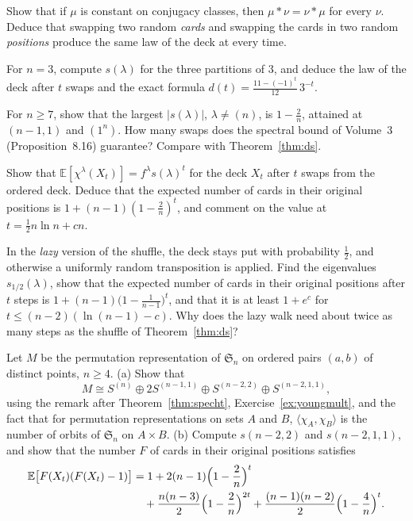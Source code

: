 \begin{exercise}[$\star$]\label{ex:leftright}
Show that if $\mu$ is constant on conjugacy classes, then $\mu*\nu=\nu*\mu$ for every $\nu$. Deduce that swapping two random \emph{cards} and swapping the cards in two random \emph{positions} produce the same law of the deck at every time.
\end{exercise}

\begin{exercise}[$\star$]\label{ex:threecards}
For $n=3$, compute $s(\lambda)$ for the three partitions of $3$, and deduce the law of the deck after $t$ swaps and the exact formula $d(t)=\frac{11-(-1)^t}{12}\,3^{-t}$.
\end{exercise}

\begin{exercise}[$\star$]\label{ex:spectralonly}
For $n\ge7$, show that the largest $|s(\lambda)|$, $\lambda\ne(n)$, is $1-\frac2n$, attained at $(n-1,1)$ and $(1^n)$. How many swaps does the spectral bound of Volume~3 (Proposition~8.16) guarantee? Compare with Theorem~\ref{thm:ds}.
\end{exercise}

\begin{exercise}[$\star\star$]\label{ex:fixedpoints}
Show that $\mathbb E[\chi^\lambda(X_t)]=f^\lambda s(\lambda)^t$ for the deck $X_t$ after $t$ swaps from the ordered deck. Deduce that the expected number of cards in their original positions is $1+(n-1)(1-\frac2n)^t$, and comment on the value at $t=\frac12n\ln n+cn$.
\end{exercise}

\begin{exercise}[$\star\star$]\label{ex:lazyhalf}
In the \emph{lazy} version of the shuffle, the deck stays put with probability $\frac12$, and otherwise a uniformly random transposition is applied. Find the eigenvalues $s_{1/2}(\lambda)$, show that the expected number of cards in their original positions after $t$ steps is
$1+(n-1)\bigl(1-\frac1{n-1}\bigr)^t$, and that it is at least $1+e^c$ for $t\le(n-2)(\ln(n-1)-c)$. Why does the lazy walk need about twice as many steps as the shuffle of Theorem~\ref{thm:ds}?
\end{exercise}

\begin{exercise}[$\star\star\star$]\label{ex:orderedpairs}
Let $M$ be the permutation representation of $\mathfrak S_n$ on ordered pairs $(a,b)$ of distinct points, $n\ge4$. (a) Show that
\[
M\cong S^{(n)}\oplus2S^{(n-1,1)}\oplus S^{(n-2,2)}\oplus S^{(n-2,1,1)},
\]
using the remark after Theorem~\ref{thm:specht}, Exercise~\ref{ex:youngmult}, and the fact that for permutation representations on sets $A$ and $B$, $\langle\chi_A,\chi_B\rangle$ is the number of orbits of $\mathfrak S_n$ on $A\times B$. (b) Compute $s(n-2,2)$ and $s(n-2,1,1)$, and
show that the number $F$ of cards in their original positions satisfies
\[
\begin{aligned}\mathbb E\bigl[F(X_t)(F(X_t)-1)\bigr]&=1+2(n-1)\Bigl(1-\frac2n\Bigr)^t\\&\quad+\frac{n(n-3)}2\Bigl(1-\frac2n\Bigr)^{2t}+\frac{(n-1)(n-2)}2\Bigl(1-\frac4n\Bigr)^t.\end{aligned}
\]
\end{exercise}

